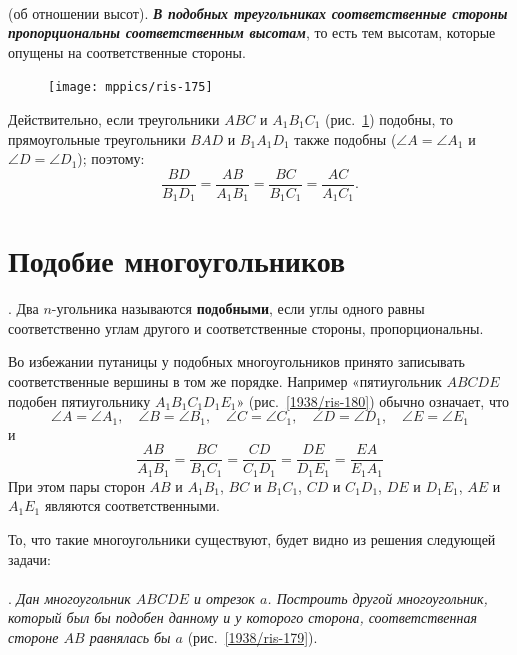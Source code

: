 \documentclass[oneside]{book}
\makeatletter
\newcommand{\rindex}[2][\imki@jobname]{%
  \index[#1]{\detokenize{#2}}%
}
\makeatother
\begin{document}
\paragraph{}\label{1938/165}
 (об отношении высот).
\textbf{\emph{В подобных треугольниках соответственные стороны пропорциональны соответственным высотам}}, то есть тем высотам, которые опущены на соответственные стороны.

\begin{figure}[h!]
\centering
\texttt{[image: mppics/ris-175]}
\caption{}\label{1938/ris-175}
\end{figure}


Действительно, если треугольники $ABC$ и $A_1B_1C_1$ (рис.~\ref{1938/ris-175}) подобны, то прямоугольные треугольники $BAD$ и $B_1A_1D_1$ также подобны ($\angle A = \angle A_1$ и $\angle D=\angle D_1$);
поэтому:
\[\frac{BD}{B_1D_1}=\frac{AB}{A_1B_1}=\frac{BC}{B_1C_1}=\frac{AC}{A_1C_1}.\]


\section{Подобие многоугольников}

\paragraph{}\label{1938/168}
.
Два $n$-угольника называются \rindex{подобные!многоугольники}\textbf{подобными}, если углы одного равны соответственно углам другого и соответственные стороны, пропорциональны.

Во избежании путаницы у подобных многоугольников принято записывать соответственные вершины в том же порядке.
Например «пятиугольник
$ABCDE$ подобен пятиугольнику $A_1B_1C_1D_1E_1$» (рис.~\ref{1938/ris-180}) обычно означает, что  
\[\angle A = \angle A_1, 
\quad
\angle B=\angle B_1,
\quad
\angle C=\angle C_1,
\quad
\angle D=\angle D_1,
\quad
\angle E=\angle E_1\]
и
\[\frac{AB}{A_1B_1}=\frac{BC}{B_1C_1}=\frac{CD}{C_1D_1}=\frac{DE}{D_1E_1}=\frac{EA}{E_1A_1}\]
При этом пары сторон $AB$ и $A_1B_1$, $BC$ и $B_1C_1$, $CD$ и $C_1D_1$, $DE$ и $D_1E_1$, $AE$ и $A_1E_1$
являются соответственными.

То, что такие многоугольники существуют, будет видно из решения следующей задачи:

\paragraph{}\label{1938/169}
.
\emph{Дан многоугольник $ABCDE$ и отрезок $a$.
Построить другой многоугольник, который был бы подобен данному и у которого сторона, соответственная стороне $AB$ 
равнялась бы $a$} (рис.~\ref{1938/ris-179}).
\end{document}
